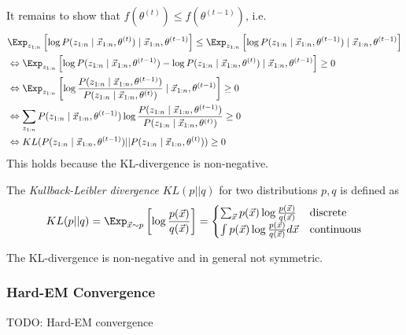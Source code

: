 It remains to show that $f(\theta^{(t)}) \leq f(\theta^{(t-1)})$,
i.e.
\begin{align*}
    & \Exp_{z_{1:n}}\left[
        \log{P(z_{1:n} \mid \vec{x}_{1:n}, \theta^{(t)})}
        \mid \vec{x}_{1:n}, \theta^{(t-1)}
    \right]
    \leq
    \Exp_{z_{1:n}}\left[
        \log{P(z_{1:n} \mid \vec{x}_{1:n}, \theta^{(t - 1)})}
        \mid \vec{x}_{1:n}, \theta^{(t-1)}
    \right] \\
    &\Leftrightarrow
    \Exp_{z_{1:n}}\left[
        \log{P(z_{1:n} \mid \vec{x}_{1:n}, \theta^{(t - 1)})}
        -
        \log{P(z_{1:n} \mid \vec{x}_{1:n}, \theta^{(t)})}
        \mid \vec{x}_{1:n}, \theta^{(t-1)}
    \right]
    \geq 0 \\
    &\Leftrightarrow
    \Exp_{z_{1:n}}\left[
        \log{
        \frac{P(z_{1:n} \mid \vec{x}_{1:n}, \theta^{(t - 1)})}{P(z_{1:n} \mid \vec{x}_{1:n}, \theta^{(t)})}
        }
        \mid \vec{x}_{1:n}, \theta^{(t-1)}
    \right]
    \geq 0 \\
    &\Leftrightarrow
    \sum_{z_{1:n}}{
        P(z_{1:n} \mid \vec{x}_{1:n}, \theta^{(t-1)})
        \log{
        \frac{P(z_{1:n} \mid \vec{x}_{1:n}, \theta^{(t - 1)})}{P(z_{1:n} \mid \vec{x}_{1:n}, \theta^{(t)})}
        }
    }
    \geq 0 \\
    &\Leftrightarrow
    KL(P(z_{1:n} \mid \vec{x}_{1:n}, \theta^{(t - 1)}) || P(z_{1:n} \mid \vec{x}_{1:n}, \theta^{(t)}))
    \geq 0
\end{align*}
This holds because the KL-divergence is non-negative.

The \emph{Kullback-Leibler divergence} $KL(p || q)$
for two distributions $p, q$ is defined as
\begin{equation*}
    KL(p || q) = \Exp_{\vec{x} \sim p}\left[
        \log{\frac{p(\vec{x})}{q(\vec{x})}}
    \right]
    = \begin{cases}
        \sum_{\vec{x}}{p(\vec{x}) \log{\frac{p(\vec{x})}{q(\vec{x})}}}
        & \text{discrete} \\
        \int{p(\vec{x}) \log{\frac{p(\vec{x})}{q(\vec{x})}} d\vec{x}}
        & \text{continuous}
    \end{cases}
\end{equation*}

The KL-divergence is non-negative
and in general not symmetric.

\subsubsection{Hard-EM Convergence}
TODO: Hard-EM convergence

